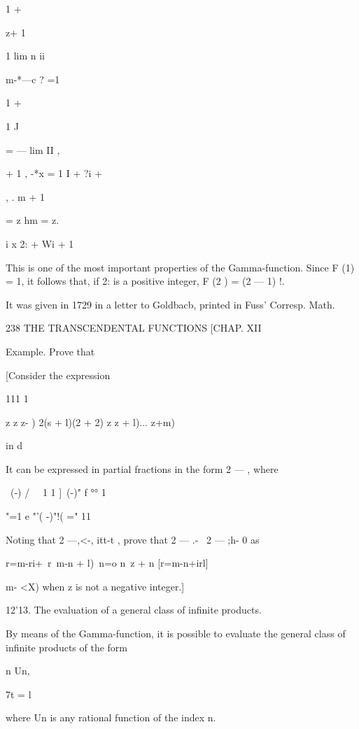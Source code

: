 1 +



z+ 1



1 lim n ii



m-*---c ? =1



1 +



1 J



= — lim II ,

  + 1 , -*x = 1 I + ?i +

, . m + 1

= z hm = z.

 i x 2: + Wi + 1

This is one of the most important properties of the Gamma-function.
Since F (1) = 1, it follows that, if 2: is a positive integer, F (2 )
= (2 — 1) !.



It was given in 1729 in a letter to Goldbacb, printed in Fuss'
Corresp. Math.



238 THE TRANSCENDENTAL FUNCTIONS [CHAP. XII

Example. Prove that

[Consider the expression

111 1



z z z- ) 2(s + l)(2 + 2) z z + l)... z+m)

in d

It can be expressed in partial fractions in the form 2 — , where

\ (-) / \ \ 1 1 ]\ (-)" f °° 1



"=1 e "'( -)"!( =" 11

Noting that 2 —,<-, itt-t , prove that 2 — .- \ 2 — ;h- 0 as

r=m-ri+\ r\ m-n + l)\ n=o n\ z + n [r=m-n+irl]

m- <X) when z is not a negative integer.]

12'13. The evaluation of a general class of infinite products.

By means of the Gamma-function, it is possible to evaluate the general
class of infinite products of the form

n Un,

7t = l

where Un is any rational function of the index n.

